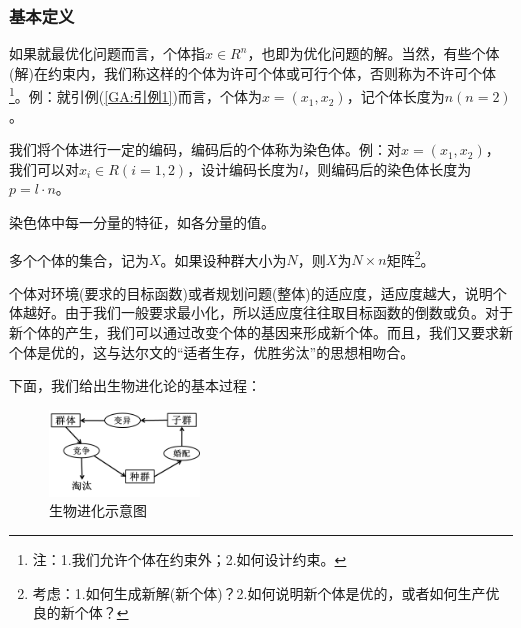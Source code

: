         \subsubsection{基本定义}
            \begin{definition}[个体]
            如果就最优化问题而言，个体指$x\in R^n$，也即为优化问题的解。当然，有些个体(解)在约束内，我们称这样的个体为许可个体或可行个体，否则称为不许可个体\footnote{注：1.我们允许个体在约束外；2.如何设计约束。}。例：就引例(\ref{GA:引例1})而言，个体为$x=(x_1,x_2)$，记个体长度为$n(n=2)$。
            \end{definition}
            \begin{definition}[染色体]
            我们将个体进行一定的编码，编码后的个体称为染色体。例：对$x=(x_1,x_2)$，我们可以对$x_i\in R(i=1,2)$，设计编码长度为$l$，则编码后的染色体长度为$p=l\cdot n$。
            \end{definition}
            \begin{definition}[基因]
            染色体中每一分量的特征，如各分量的值。
            \end{definition}
            \begin{definition}[种群]
            多个个体的集合，记为$X$。如果设种群大小为$N$，则$X$为$N\times n$矩阵\footnote{考虑：1.如何生成新解(新个体)？2.如何说明新个体是优的，或者如何生产优良的新个体？}。
            \end{definition}
            \begin{definition}[适应度]
            个体对环境(要求的目标函数)或者规划问题(整体)的适应度，适应度越大，说明个体越好。由于我们一般要求最小化，所以适应度往往取目标函数的倒数或负。对于新个体的产生，我们可以通过改变个体的基因来形成新个体。而且，我们又要求新个体是优的，这与达尔文的“适者生存，优胜劣汰”的思想相吻合。
            \end{definition}
            \par
            下面，我们给出生物进化论的基本过程：
                \begin{figure}[H]
                \centering
                \includegraphics[width=4cm]{images/Biological_evolution.jpg}
                \caption{生物进化示意图}
                \label{fig:生物进化示意图}
                \end{figure}
